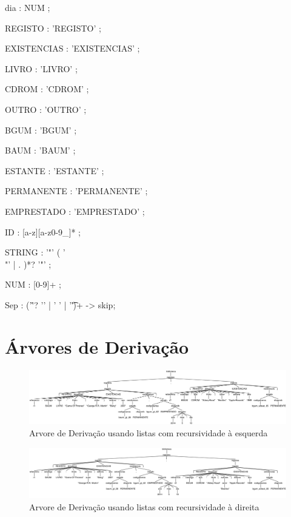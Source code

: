 \begin{spverbatim}
dia         : NUM ;

REGISTO     : 'REGISTO' ;

EXISTENCIAS : 'EXISTENCIAS' ;

LIVRO       : 'LIVRO' ;

CDROM       : 'CDROM' ;

OUTRO       : 'OUTRO' ;

BGUM        : 'BGUM' ;

BAUM        : 'BAUM' ;

ESTANTE     : 'ESTANTE' ;

PERMANENTE  : 'PERMANENTE' ;

EMPRESTADO  : 'EMPRESTADO' ;

ID          : [a-z][a-z0-9_]* ;

STRING      : '"' ( '\\"' | . )*? '"' ;

NUM         : [0-9]+ ;

Sep         :    ('\r'? '\n' | ' ' | '\t')+ -> skip;

\end{spverbatim}
\newpage

\clearpage
\newpage
\section{Árvores de Derivação}
\begin{figure}[!h]
	\centering
    \includegraphics[angle = 90,height =0.95\paperwidth]{./imagens/alineaa.png}
    \caption{Arvore de Derivação usando listas com recursividade à esquerda}
    \label{fig:anexo_a}
\end{figure}
\begin{figure}[!h]
  \centering
    \includegraphics[angle = 90,height =0.95\paperwidth]{./imagens/alineac.png}
    \caption{Arvore de Derivação usando listas com recursividade à direita}
    \label{fig:anexo_a}
\end{figure}
\newpage
